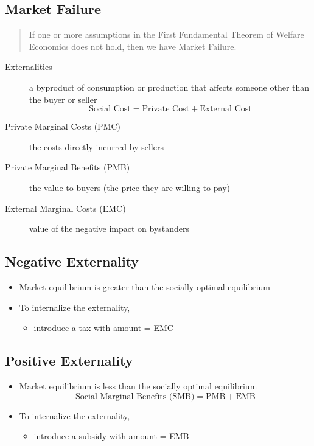 \documentclass{article}
\begin{document}
\begin{multicols}{2}
\section{Market Failure}
\begin{quotation}
	If one or more assumptions in the First Fundamental Theorem of Welfare Economics does not hold, then we have Market Failure.
\end{quotation}
\begin{description}
	\item[Externalities] a byproduct of consumption or production that affects someone other than the buyer or seller
$$\text{Social Cost} = \text{Private Cost} + \text{External Cost}$$
    \item[Private Marginal Costs (PMC)] the costs directly incurred by sellers
    \item[Private Marginal Benefits (PMB)] the value to buyers (the price they are willing to pay)
    \item[External Marginal Costs (EMC)] value of the negative impact on bystanders
\end{description}
\subsection{Negative Externality}
\begin{itemize}
	\item Market equilibrium is greater than the socially optimal equilibrium
	\item To internalize the externality,
	\begin{itemize}
		\item introduce a tax with amount = EMC
	\end{itemize}
\end{itemize}
\subsection{Positive Externality}
\begin{itemize}
	\item Market equilibrium is less than the socially optimal equilibrium
	$$\text{Social Marginal Benefits (SMB)} = \text{PMB} + \text{EMB}$$
	\item To internalize the externality,
	\begin{itemize}
		\item introduce a subsidy with amount = EMB
	\end{itemize}
\end{itemize}

\end{multicols}
\end{document}
